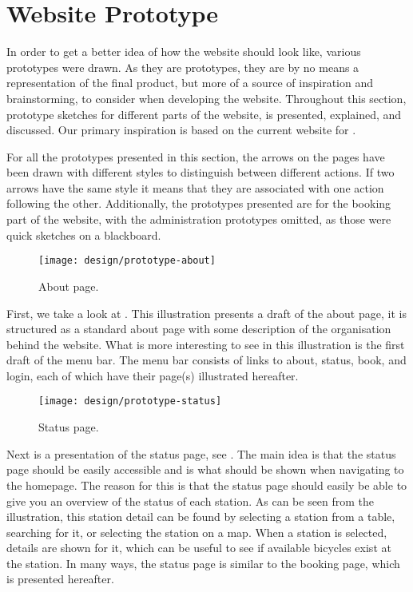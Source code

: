 \section{Website Prototype}\label{sec:prototype}
In order to get a better idea of how the website should look like, various prototypes were drawn.
As they are prototypes, they are by no means a representation of the final product, but more of a source of inspiration and brainstorming, to consider when developing the website.
Throughout this section, prototype sketches for different parts of the website, is presented, explained, and discussed.
Our primary inspiration is based on the current website for \bycykel \citep{misc:aalborgbycykelMain}.

For all the prototypes presented in this section, the arrows on the pages have been drawn with different styles to distinguish between different actions. 
If two arrows have the same style it means that they are associated with one action following the other.
Additionally, the prototypes presented are for the booking part of the website, with the administration prototypes omitted, as those were quick sketches on a blackboard.

\begin{figure}[h]
	\centering
	\texttt{[image: design/prototype-about]}
	\caption{About page.}\label{fig:prototype-about}
\end{figure}

 
First, we take a look at .
This illustration presents a draft of the about page, it is structured as a standard about page with some description of the organisation behind the website.
What is more interesting to see in this illustration is the first draft of the menu bar.
The menu bar consists of links to about, status, book, and login, each of which have their page(s) illustrated hereafter.

\begin{figure}[h]
	\centering
	\texttt{[image: design/prototype-status]}
	\caption{Status page.}\label{fig:prototype-status}
\end{figure}

Next is a presentation of the status page, see .
The main idea is that the status page should be easily accessible and is what should be shown when navigating to the homepage.
The reason for this is that the status page should easily be able to give you an overview of the status of each station.
As can be seen from the illustration, this station detail can be found by selecting a station from a table, searching for it, or selecting the station on a map.
When a station is selected, details are shown for it, which can be useful to see if available bicycles exist at the station.
In many ways, the status page is similar to the booking page, which is presented hereafter.

